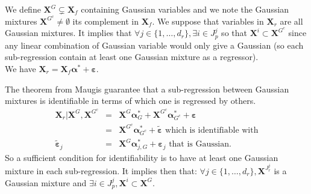 \documentclass[12pt,a4paper]{report}
\begin{document}
	
We define $\boldsymbol{X}^G \subsetneq \boldsymbol{X}_f$ containing Gaussian variables and we note the Gaussian mixtures $\boldsymbol{X}^{G^c}\neq \emptyset$ its complement in $\boldsymbol{X}_f$.
We suppose that variables in $\boldsymbol{X}_r$ are all Gaussian mixtures. It implies that $\forall j\in \{1,\dots,d_r\},\exists i \in J_p^j $ so that $\boldsymbol{X}^i \subset \boldsymbol{X}^{G^c} $ since any linear combination of Gaussian variable would only give a Gaussian (so each sub-regression contain at least one Gaussian mixture as a regressor).
\\
	We have $\boldsymbol{X}_r=\boldsymbol{X}_f\boldsymbol{\alpha}^* + \boldsymbol{\varepsilon}$. 
	
The theorem from Maugis guarantee that a sub-regression between Gaussian mixtures is identifiable in terms of which one is regressed by others.
		\begin{eqnarray}
		 \boldsymbol{X}_{r}|\boldsymbol{X}^G,\boldsymbol{X}^{G^c}&=& \boldsymbol{X}^G\boldsymbol{\alpha}_G^*+\boldsymbol{X}^{G^c}\boldsymbol{\alpha}_{G^c}^*+ \boldsymbol{\varepsilon} \\
			&=& \boldsymbol{X}^{G^c}\boldsymbol{\alpha}_{G^c}^* + \tilde{\boldsymbol{\varepsilon}} \textrm{ which is identifiable with} \\
			\tilde{\boldsymbol{\varepsilon}}_j&=&\boldsymbol{X}^{G}\boldsymbol{\alpha}_{j,G}^*+ \boldsymbol{\varepsilon}_j \textrm{ that is Gaussian.}  
		\end{eqnarray}
		So a sufficient condition for identifiability is to have at least one Gaussian mixture in each sub-regression.	
		It implies then that: $\forall j \in \{1,\dots,d_r \}, \boldsymbol{X}^{J_r^j} $ is a Gaussian mixture and $\exists i \in J_p^j,\boldsymbol{X}^{i} \subset \boldsymbol{X}^G $.  \\
		
\end{document}
